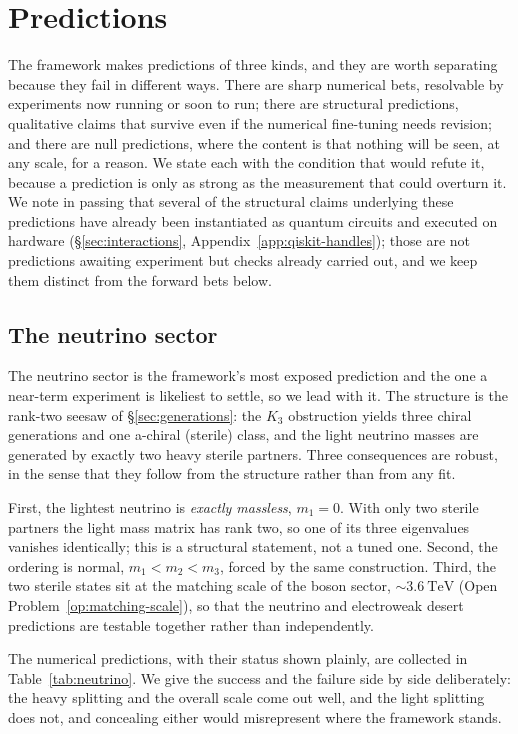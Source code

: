 \section{Predictions}
\label{sec:predictions}

The framework makes predictions of three kinds, and they are worth separating because they fail in
different ways. There are sharp numerical bets, resolvable by experiments now running or soon to run;
there are structural predictions, qualitative claims that survive even if the numerical fine-tuning
needs revision; and there are null predictions, where the content is that nothing will be seen, at any
scale, for a reason. We state each with the condition that would refute it, because a prediction is
only as strong as the measurement that could overturn it. We note in passing that several of the
structural claims underlying these predictions have already been instantiated as quantum circuits and
executed on hardware (\S\ref{sec:interactions}, Appendix~\ref{app:qiskit-handles}); those are not
predictions awaiting experiment but checks already carried out, and we keep them distinct from the
forward bets below.

\subsection{The neutrino sector}

The neutrino sector is the framework's most exposed prediction and the one a near-term experiment is
likeliest to settle, so we lead with it. The structure is the rank-two seesaw of
\S\ref{sec:generations}: the $K_3$ obstruction yields three chiral generations and one a-chiral
(sterile) class, and the light neutrino masses are generated by exactly two heavy sterile partners.
Three consequences are robust, in the sense that they follow from the structure rather than from any
fit.

First, the lightest neutrino is \emph{exactly massless}, $m_1 = 0$. With only two sterile partners
the light mass matrix has rank two, so one of its three eigenvalues vanishes identically; this is a
structural statement, not a tuned one. Second, the ordering is normal, $m_1 < m_2 < m_3$, forced by
the same construction. Third, the two sterile states sit at the matching scale of the boson sector,
$\sim 3.6\ \mathrm{TeV}$ (Open Problem~\ref{op:matching-scale}), so that the neutrino and electroweak
desert predictions are testable together rather than independently.

The numerical predictions, with their status shown plainly, are collected in
Table~\ref{tab:neutrino}. We give the success and the failure side by side deliberately: the heavy
splitting and the overall scale come out well, and the light splitting does not, and concealing
either would misrepresent where the framework stands.

